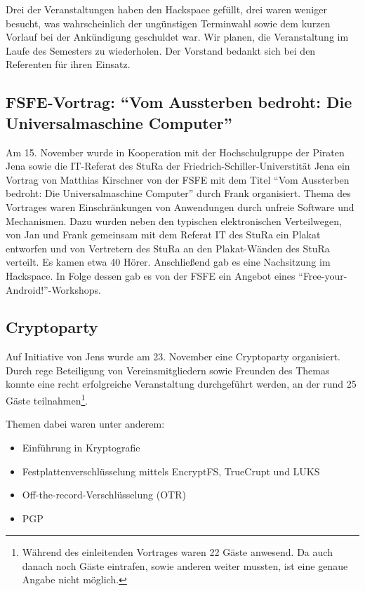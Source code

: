 \documentclass[10pt,DIV16]{scrartcl}
\begin{document}
Drei der Veranstaltungen haben den Hackspace gefüllt, drei waren weniger
besucht, was wahrscheinlich der ungünstigen Terminwahl sowie dem kurzen
Vorlauf bei der Ankündigung geschuldet war.  Wir planen, die Veranstaltung im
Laufe des Semesters zu wiederholen.  Der Vorstand bedankt sich bei den
Referenten für ihren Einsatz.

\subsection{FSFE-Vortrag: "`Vom Aussterben bedroht: Die Universalmaschine Computer"'}
\label{sec:fsfevortrag}

Am 15. November wurde in Kooperation mit der Hochschulgruppe der
Piraten Jena sowie die IT-Referat des StuRa der
Friedrich-Schiller-Universtität Jena ein Vortrag von Matthias
Kirschner von der FSFE mit dem Titel "`Vom Aussterben bedroht: Die
Universalmaschine Computer"' durch Frank organisiert.  Thema des
Vortrages waren Einschränkungen von Anwendungen durch unfreie
Software und Mechanismen. Dazu wurden neben den typischen
elektronischen Verteilwegen, von Jan und Frank gemeinsam mit dem
Referat IT des StuRa ein Plakat entworfen und von Vertretern des
StuRa an den Plakat-Wänden des StuRa verteilt. Es kamen etwa 40
Hörer. Anschließend gab es eine Nachsitzung im Hackspace. In Folge
dessen gab es von der FSFE ein Angebot eines
"`Free-your-Android!"'-Workshops.


\subsection{Cryptoparty}

Auf Initiative von Jens wurde am 23. November eine Cryptoparty organisiert.
Durch rege Beteiligung von Vereinsmitgliedern sowie Freunden des Themas konnte
eine recht erfolgreiche Veranstaltung durchgeführt werden, an der rund 25
Gäste teilnahmen\footnote{Während des einleitenden Vortrages waren 22 Gäste
anwesend. Da auch danach noch Gäste eintrafen, sowie anderen weiter mussten,
ist eine genaue Angabe nicht möglich.}.

Themen dabei waren unter anderem:

\begin{itemize}
	\item Einführung in Kryptografie
	\item Festplattenverschlüsselung mittels EncryptFS, TrueCrupt und LUKS
	\item Off-the-record-Verschlüsselung (OTR)
	\item PGP
\end{itemize}
\end{document}
